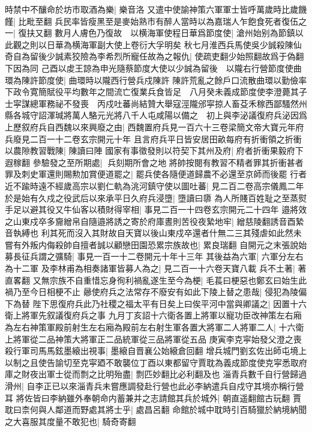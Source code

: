 時禁中不釀命於坊市取酒為樂|{
	樂音洛}
又遣中使諭神策六軍軍士皆呼萬歲時比歲饑饉|{
	比毗至翻}
兵民率皆瘦黑至是麥始熟市有醉人當時以為嘉瑞人乍飽食死者復伍之一|{
	復扶又翻}
數月人膚色乃復故　以横海軍使程日華爲節度使|{
	滄州始别為節鎮以此觀之則以日華為横海軍副大使上卷衍大孚明矣}
秋七月淮西兵馬使吳少誠殺陳仙奇自為留後少誠素狡險為李希烈所寵任故為之報仇|{
	使疏吏翻少始照翻故爲于偽翻下因為同}
己酉以䖍王諒為申光隨蔡節度大使以少誠為留後　以隴右行營節度使曲環為陳許節度使|{
	曲環時以隴西行營兵戍陳許}
陳許荒亂之餘戶口流散曲環以勤儉率下政令寛簡賦役平均數年之間流亡復業兵食皆足　八月癸未義成節度使李澄薨其子士寜謀總軍務祕不發喪　丙戍吐蕃尚結贊大舉寇涇隴邠寜掠人畜芟禾稼西鄙騷然州縣各城守詔渾瑊將萬人駱元光將八千人屯咸陽以備之　初上與李泌議復府兵泌因爲上歷叙府兵自西魏以來興廢之由|{
	西魏置府兵見一百六十三卷梁簡文帝大寶元年府兵廢見二百一十二卷玄宗開元十年}
且言府兵平日皆安居田畝每府有折衝領之折衝以農隙教習戰陳|{
	陳讀曰陣}
國家有事徵發則以符契下其州及府|{
	府者折衝果毅府下遐稼翻}
參驗發之至所期處|{
	兵刻期所會之地}
將帥按閱有教習不精者罪其折衝甚者罪及刺史軍還則賜勲加賞便道罷之|{
	罷兵使各隨便道歸農不必還至京師而後罷}
行者近不踰時遠不經歲高宗以劉仁軌為洮河鎮守使以圖吐蕃|{
	見二百二卷高宗儀鳳二年}
於是始有久戍之役武后以來承平日久府兵浸墮|{
	墮讀曰隳}
為人所賤百姓耻之至蒸熨手足以避其役又牛仙客以積財得宰相|{
	事見二百一十四卷玄宗開元二十四年}
邉將效之山東戍卒多齎繒帛自隨邉將誘之寄於府庫晝則苦役夜縶地牢|{
	繒慈陵翻誘音酉縶音執縛也}
利其死而沒入其財故自天寶以後山東戍卒還者什無二三其殘虐如此然未嘗有外叛内侮殺帥自擅者誠以顧戀田園恐累宗族故也|{
	累良瑞翻}
自開元之末張說始募長征兵謂之彍騎|{
	事見一百一十二卷開元十年十三年}
其後益為六軍|{
	六軍分左右為十二軍}
及李林甫為相奏諸軍皆募人為之|{
	見二百一十六卷天寶八載}
兵不土著|{
	著直畧翻}
又無宗族不自重惜忘身徇利禍亂遂生至今為梗|{
	毛萇曰梗惡也鄭玄曰始生此禍乃至今日相梗不止}
曏使府兵之法常存不廢安有如此下陵上替之患哉|{
	侵犯為陵偏下為替}
陛下思復府兵此乃社稷之福太平有日矣上曰俟平河中當與卿議之|{
	因置十六衛上將軍先叙議復府兵之事}
九月丁亥詔十六衛各置上將軍以寵功臣改神策左右廂為左右神策軍殿前射生左右廂為殿前左右射生軍各置大將軍二人將軍二人|{
	十六衛上將軍從二品神策大將軍正二品統軍從三品將軍從五品}
庚寅李克寜始發父澄之喪殺行軍司馬馬鉉墨縗出視事|{
	墨縗自晋襄公始縗倉回翻}
增兵城門劉玄佐出師屯境上以制之且使告諭切至克寜廼不敢襲位丁酉以東都留守賈耽為義成節度使克寜悉取府庫之財夜出軍士從而剽之比明殆盡|{
	剽匹妙翻比必利翻及也}
淄青兵數千自行營歸過滑州|{
	自李正已以來淄青兵未嘗應調發赴行營也此必李納遣兵自戍守其境亦稱行營耳}
將佐皆曰李納雖外奉朝命内蓄兼并之志請館其兵於城外|{
	朝直遥翻館古玩翻}
賈耽曰柰何與人鄰道而野處其將士乎|{
	處昌呂翻}
命館於城中耽時引百騎獵於納境納聞之大喜服其度量不敢犯也|{
	騎奇寄翻}
